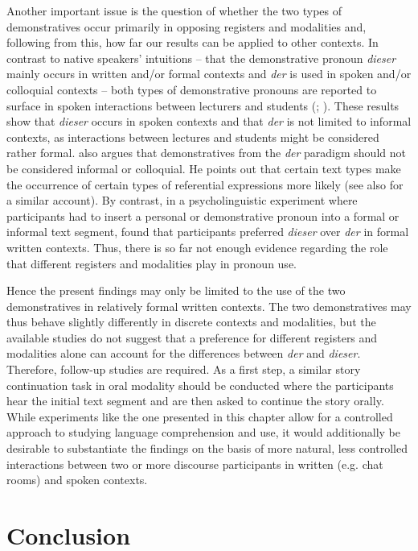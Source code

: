 \documentclass[output=paper,colorlinks,citecolor=brown]{langscibook}
\begin{document}
Another important issue is the question of whether the two types of demonstratives occur primarily in opposing registers and modalities and, following from this, how far our results can be applied to other contexts. In contrast to native speakers’ intuitions – that the demonstrative pronoun \textit{dieser} mainly occurs in written and/or formal contexts and \textit{der} is used in spoken and/or colloquial contexts – both types of demonstrative pronouns are reported to surface in spoken interactions between lecturers and students (\citealt{Ahrenholz2007}; \citealt{Weinert2007}). These results show that \textit{dieser} occurs in spoken contexts and that \textit{der} is not limited to informal contexts, as interactions between lectures and students might be considered rather formal. \citet{Weinrich1993} also argues that demonstratives from the \textit{der} paradigm should not be considered informal or colloquial. He points out that certain text types make the occurrence of certain types of referential expressions more likely (see also \citealt{Ahrenholz2007} for a similar account). By contrast, in a psycholinguistic experiment where participants had to insert a personal or demonstrative pronoun into a formal or informal text segment, \citet{PatilEtAl2020} found that participants preferred \textit{dieser} over \textit{der} in formal written contexts. Thus, there is so far not enough evidence regarding the role that different registers and modalities play in pronoun use. 

Hence the present findings may only be limited to the use of the two demonstratives in relatively formal written contexts. The two demonstratives may thus behave slightly differently in discrete contexts and modalities, but the available studies do not suggest that a preference for different registers and modalities alone can account for the differences between \textit{der} and \textit{dieser}. Therefore, follow-up studies are required. As a first step, a similar story continuation task in oral modality should be conducted where the participants hear the initial text segment and are then asked to continue the story orally. While experiments like the one presented in this chapter allow for a controlled approach to studying language comprehension and use, it would additionally be desirable to substantiate the findings on the basis of more natural, less controlled interactions between two or more discourse participants in written (e.g. chat rooms) and spoken contexts.  

\section{Conclusion}\label{sec:fuchs:4}
\end{document}
